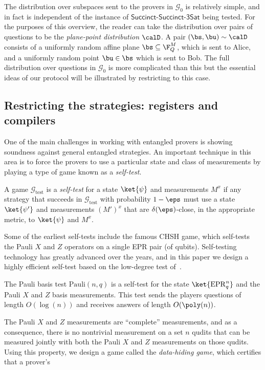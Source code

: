 \documentclass[11pt]{article}
\newcommand{\succinctsquared}{\mathsf{Succinct}\text{-}\mathsf{Succinct}\text{-}\mathsf{3Sat}}
\newcommand{\game}{\mathscr{G}}
\newcommand{\epr}{\mathrm{EPR}}
\newcommand{\paulistrat}[2]{\mathrm{Pauli}(#1,#2)}
\begin{document}
The distribution over subspaces sent to the provers in $\game_0$ is
relatively simple, and in fact is independent of the instance of
$\succinctsquared$ being tested. For the purposes of this overview, the
reader can take the distribution over pairs of questions to be the
\emph{plane-point distribution} $\calD$. A pair $(\bs, \bu) \sim
\calD$ consists of a uniformly random affine plane $\bs \subseteq
\F_Q^M$, which is sent to Alice, and a uniformly random point $\bu
\in \bs$ which is sent to Bob. The full distribution over
questions in $\game_0$ is more complicated than this but the essential
ideas of our protocol will be illustrated by restricting to this case.
\subsection{Restricting the strategies: registers and compilers}
One of the main challenges in working with entangled provers is
showing soundness against general entangled strategies. An important
technique in this area is to force the provers to use a particular
state and class of measurements by playing a type of game known as a
\emph{self-test}.
\begin{infdef}
  A game $\game_{\mathrm{test}}$ is a \emph{self-test} for a state
  $\ket{\psi}$ and measurements $M^x$ if any strategy that succeeds in
  $\game_{\mathrm{test}}$ with probability $1- \eps$ must use a state
  $\ket{\psi'}$ and measurements $(M')^x$ that are
  $\delta(\eps)$-close, in the appropriate metric, to $\ket{\psi}$ and $M^x$.
\end{infdef}
Some of the earliest self-tests include the famous CHSH game, which
self-tests the Pauli $X$ and $Z$ operators on a single EPR pair (of
qubits). Self-testing technology has greatly advanced over the years,
and in this paper we design a highly efficient self-test based on the
low-degree test of~\cite{NV18a}.
\begin{infthm}
  The Pauli basis test $\paulistrat{n}{q}$ is a self-test for the
  state $\ket{\epr_q^n}$ and the Pauli $X$ and $Z$ basis
  measurements. This test sends the players questions of length
  $O(\log(n))$ and receives answers of length $O(\poly(n))$.
\end{infthm}
The Pauli $X$ and $Z$ measurements are ``complete'' measurements, and
as a consequence, there is no nontrivial measurement on a set $n$
qudits that can be measured jointly with both the Pauli $X$ and $Z$
measurements on those qudits. Using this property, we design a game
called the \emph{data-hiding game}, which certifies that a prover's
\end{document}
